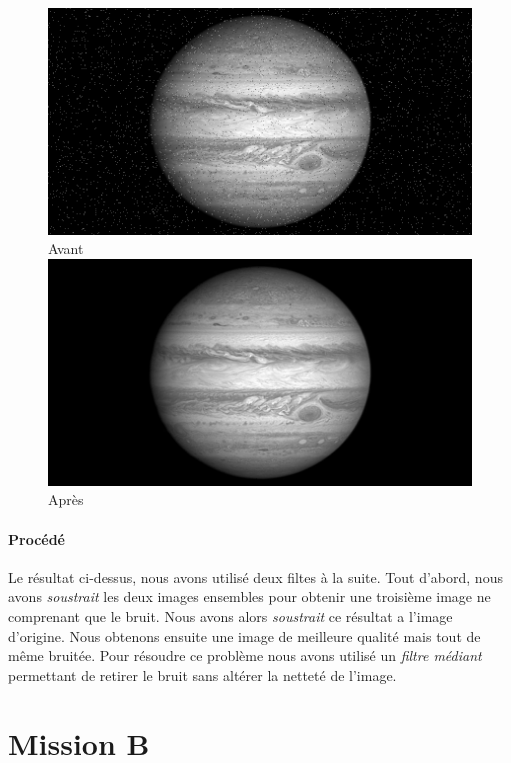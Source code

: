 \documentclass[12pt]{article}
\begin{document}
	\begin{figure}[h]
	\centering
		\begin{multicols}{2}
		\includegraphics[scale=0.325]{images/Jupiter.png}
		Avant
		\includegraphics[scale=0.325]{images/JupiterAp.png}
		Après
		\end{multicols}
	\end{figure}
	\vspace{-0.9cm}

	\paragraph{Procédé}	
		Le résultat ci-dessus, nous avons utilisé deux filtes à la suite. Tout d'abord, nous avons \emph{soustrait} les deux images ensembles pour obtenir une troisième image ne comprenant que le bruit. Nous avons alors \emph{soustrait} ce résultat a l'image d'origine. Nous obtenons ensuite une image de meilleure qualité mais tout de même bruitée. Pour résoudre ce problème nous avons utilisé un \emph{filtre médiant} permettant de retirer le bruit sans altérer la netteté de l'image.

\newpage

\section{Mission B}
\end{document}

